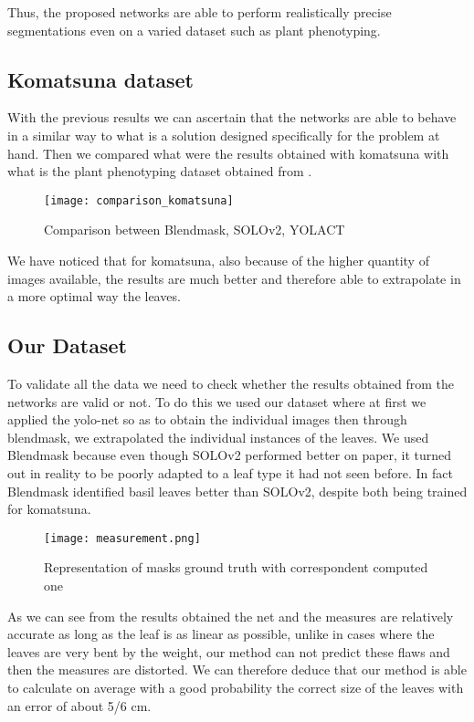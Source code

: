 Thus, the proposed networks are able to perform realistically precise segmentations even on a varied dataset such as plant phenotyping.

\subsection{Komatsuna dataset}
With the previous results we can ascertain that the networks are able to behave in a similar way to what is a solution designed specifically for the problem at hand.
Then we compared what were the results obtained with komatsuna with what is the plant phenotyping dataset obtained from \cite{9411981}. 

\begin{figure}[ht]
  \centering
  \texttt{[image: comparison\_komatsuna]}%
  \caption{Comparison between Blendmask\cite{chen2020blendmask}, SOLOv2\cite{wang2020solov2}, YOLACT\cite{bolya2019yolact}}%
\end{figure}

We have noticed that for komatsuna, also because of the higher quantity of images available, the results are much better and therefore able to extrapolate in
a more optimal way the leaves.

\subsection{Our Dataset}
To validate all the data we need to check whether the results obtained from the networks are valid or not. To do this we used our dataset where at first we
applied the yolo-net so as to obtain the individual images then through blendmask, we extrapolated the individual instances of the leaves.
We used Blendmask because even though SOLOv2 performed better on paper, it turned out in reality to be poorly adapted to a leaf type it had not seen before.
In fact Blendmask identified basil leaves better than SOLOv2, despite both being trained for komatsuna.

\begin{figure}[ht]
  \centering
  \texttt{[image: measurement.png]}
  \caption{Representation of masks ground truth with correspondent computed one}
\end{figure}

As we can see from the results obtained the net and the measures are relatively accurate as long as the leaf is as linear as possible, unlike in cases where
the leaves are very bent by the weight, our method can not predict these flaws and then the measures are distorted. We can therefore deduce that our method is able
to calculate on average with a good probability the correct size of the leaves with an error of about 5/6 cm.



